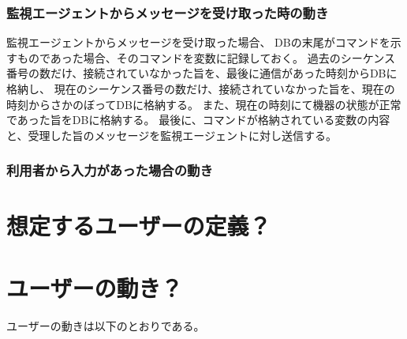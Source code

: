 \subsubsection{監視エージェントからメッセージを受け取った時の動き}
監視エージェントからメッセージを受け取った場合、
DBの末尾がコマンドを示すものであった場合、そのコマンドを変数に記録しておく。
過去のシーケンス番号の数だけ、接続されていなかった旨を、最後に通信があった時刻からDBに格納し、
現在のシーケンス番号の数だけ、接続されていなかった旨を、現在の時刻からさかのぼってDBに格納する。
また、現在の時刻にて機器の状態が正常であった旨をDBに格納する。
最後に、コマンドが格納されている変数の内容と、受理した旨のメッセージを監視エージェントに対し送信する。

\subsubsection{利用者から入力があった場合の動き}


\section{想定するユーザーの定義？}

\section{ユーザーの動き？}
ユーザーの動きは以下のとおりである。









